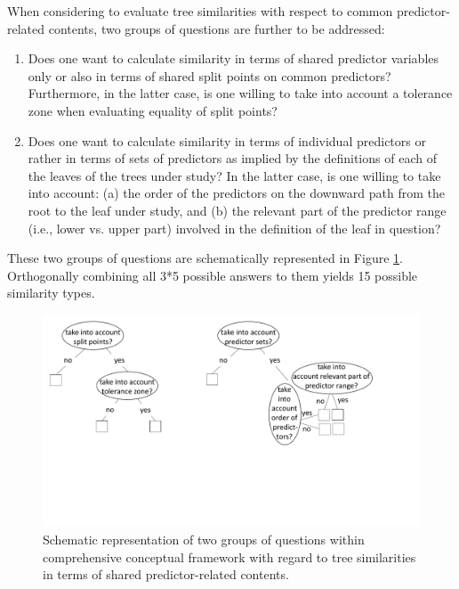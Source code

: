 When considering to evaluate tree similarities with respect to common predictor-related contents, two groups of questions are further to be addressed:
\begin{enumerate}
\item{Does one want to calculate similarity in terms of shared predictor variables only or also in terms of shared split points on common predictors? Furthermore, in the latter case, is one willing to take into account a tolerance zone when evaluating equality of split points?}
\item{Does one want to calculate similarity in terms of individual predictors or rather in terms of sets of predictors as implied by the definitions of each of the leaves of the trees under study? In the latter case, is one willing to take into account: (a) the order of the predictors on the downward path from the root to the leaf under study, and (b) the relevant part of the predictor range (i.e., lower vs. upper part) involved in the definition of the leaf in question?}
\end{enumerate}
These two groups of questions are schematically represented in Figure \ref{figSim1}. Orthogonally combining all 3*5 possible answers to them yields 15 possible similarity types.

\begin{figure}[H]
	\centering
	\includegraphics[width=\linewidth, trim=0 7cm 0 0, clip]{sim2.pdf}
	\caption{Schematic representation of two groups of questions within comprehensive conceptual framework with regard to tree similarities in terms of shared predictor-related contents.}
	\label{figSim1}
\end{figure}

